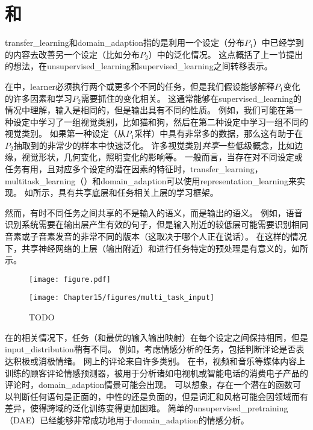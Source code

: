 
\section{和}
\label{sec:transfer_learning_and_domain_adaptation}
\gls{transfer_learning}和\gls{domain_adaption}指的是利用一个设定（分布$P_1$）中已经学到的内容去改善另一个设定（比如分布$P_2$）中的泛化情况。
这点概括了上一节提出的想法，在\gls{unsupervised_learning}和\gls{supervised_learning}之间转移表示。


在中，\gls{learner}必须执行两个或更多个不同的任务，但是我们假设能够解释$P_1$变化的许多因素和学习$P_2$需要抓住的变化相关。
这通常能够在\gls{supervised_learning}的情况中理解，输入是相同的，但是输出具有不同的性质。
例如，我们可能在第一种设定中学习了一组视觉类别，比如猫和狗，然后在第二种设定中学习一组不同的视觉类别。
如果第一种设定（从$P_1$采样）中具有非常多的数据，那么这有助于在$P_2$抽取到的非常少的样本中快速泛化。
许多视觉类别\emph{共享}一些低级概念，比如边缘，视觉形状，几何变化，照明变化的影响等。
一般而言，当存在对不同设定或任务有用，且对应多个设定的潜在因素的特征时，\gls{transfer_learning}，\gls{multitask_learning}（）和\gls{domain_adaption}可以使用\gls{representation_learning}来实现。
如所示，具有共享底层和任务相关上层的学习框架。


然而，有时不同任务之间共享的不是输入的语义，而是输出的语义。
例如，语音识别系统需要在输出层产生有效的句子，但是输入附近的较低层可能需要识别相同音素或子音素发音的非常不同的版本（这取决于哪个人正在说话）。
在这样的情况下，共享神经网络的上层（输出附近）和进行任务特定的预处理是有意义的，如所示。

\begin{figure}[!htb]
\ifOpenSource
\centerline{\texttt{[image: figure.pdf]}}
\else
\centerline{\texttt{[image: Chapter15/figures/multi\_task\_input]}}
\fi
\caption{TODO}
\label{fig:chap15_multi_task_input}
\end{figure}

在的相关情况下，任务（和最优的输入输出映射）在每个设定之间保持相同，但是\gls{input_distribution}稍有不同。 
例如，考虑情感分析的任务，包括判断评论是否表达积极或消极情绪。 
网上的评论来自许多类别。
在书，视频和音乐等媒体内容上训练的顾客评论情感预测器，被用于分析诸如电视机或智能电话的消费电子产品的评论时，\gls{domain_adaption}情景可能会出现。
可以想象，存在一个潜在的函数可以判断任何语句是正面的，中性的还是负面的，但是词汇和风格可能会因领域而有差异，使得跨域的泛化训练变得更加困难。
简单的\gls{unsupervised_pretraining}（\gls{DAE}）已经能够非常成功地用于\gls{domain_adaption}的情感分析\citep{Glorot+al-ICML-2011}。

